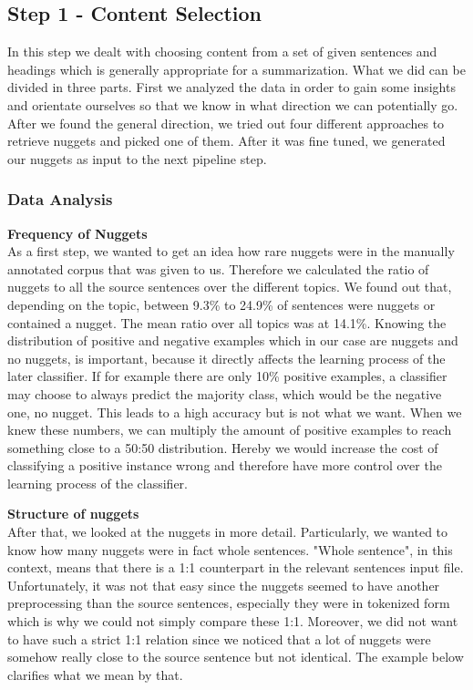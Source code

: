 
\subsection{Step 1 - Content Selection}
In this step we dealt with choosing content from a set of given sentences and headings which is generally appropriate for a summarization. What we did can be divided in three parts. First we analyzed the data in order to gain some insights and orientate ourselves so that we know in what direction we can potentially go. After we found the general direction, we tried out four different approaches to retrieve nuggets and picked one of them. After it was fine tuned, we generated our nuggets as input to the next pipeline step.
\subsubsection{Data Analysis}
\textbf{Frequency of Nuggets} \\
As a first step, we wanted to get an idea how rare nuggets were in the manually annotated corpus that was given to us. Therefore we calculated the ratio of nuggets to all the source sentences over the different topics. We found out that, depending on the topic, between 9.3\% to 24.9\% of sentences were nuggets or contained a nugget. The mean ratio over all topics was at 14.1\%. Knowing the distribution of positive and negative examples which in our case are nuggets and no nuggets, is important, because it directly affects the learning process of the later classifier. If for example there are only 10\% positive examples, a classifier may choose to always predict the majority class, which would be the negative one, no nugget. This leads to a high accuracy but is not what we want. When we knew these numbers, we can multiply the amount of positive examples to reach something close to a 50:50 distribution. Hereby we would increase the cost of classifying a positive instance wrong and therefore have more control over the learning process of the classifier. \newline

\textbf{Structure of nuggets}\\
After that, we looked at the nuggets in more detail. Particularly, we wanted to know how many nuggets were in fact whole sentences. "Whole sentence", in this context, means that there is a 1:1 counterpart in the relevant sentences input file. Unfortunately, it was not that easy since the nuggets seemed to have another preprocessing than the source sentences, especially they were in tokenized form which is why we could not simply compare these 1:1. Moreover, we did not want to have such a strict 1:1 relation since we noticed that a lot of nuggets were somehow really close to the source sentence but not identical. The example below clarifies what we mean by that. \\

